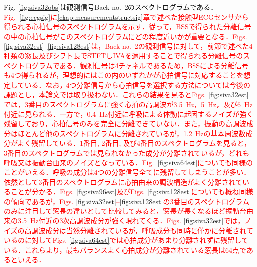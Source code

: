 Fig. \ref{fig:siva32obs}は観測信号Back no.~2のスペクトログラムである．\textcolor{red}{Fig.~\ref{fig:ecgsig}に\ref{chap:measurementstructsig}章で述べた接触型ECGセンサから得られる心拍信号のスペクトログラムを示す．従って，BSSで得られた分離信号の中の心拍信号がこのスペクトログラムにどの程度近いかが重要となる．Figs. \ref{fig:siva32est}--\ref{fig:siva128est}は，Back no.~2の観測信号に対して，前節で述べた4種類の窓長及びシフト長でSTFTしIVAを適用することで得られる分離信号のスペクトログラムである．観測信号は4チャネルであるため，BSSによる分離信号も4つ得られるが，理想的にはこの内のいずれかが心拍信号に対応することを想定している．なお，4つ分離信号から心拍信号を選択する方法については今後の課題とし，本論文では取り扱わない．これらの結果を見るとFigs. \ref{fig:siva32est}では，3番目のスペクトログラムに強く心拍の高調波が3.5~Hz，5~Hz，及び6~Hz付近に見られる．一方で，0.4~Hz付近に呼吸による体動に起因するノイズが強く残留しており，心拍信号のみを完全に分離できていない．また，振動の高調波成分はほとんど他のスペクトログラムに分離されているが，1.2~Hzの基本周波数成分がよく残留している．1番目, 2番目, 及び4番目のスペクトログラムを見ると，3番目のスペクトログラムでは見られなかった成分が分離されているが，どれも呼吸又は振動台由来のノイズとなっている．Fig.~\ref{fig:siva64est}についても同様のことがいえる．呼吸の成分は4つの分離信号全てに残留してしまうことが多い．依然として3番目のスペクトログラムに心拍由来の調波構造がよく分離されていることが分かる．Figs. \ref{fig:siva96est}及びFigs. \ref{fig:siva128est}についても概ね同様の傾向であるが，Figs. \ref{fig:siva32est}--\ref{fig:siva128est}の3番目のスペクトログラムのみに注目して窓長の違いとして比較してみると，窓長が長くなるほど振動台由来の3.5~Hz付近の3次高調波成分が強く現れてくる．Figs. \ref{fig:siva32est}では，ノイズの高調波成分は当然分離されているが，呼吸成分も同時に僅かに分離されているのに対してFigs. \ref{fig:siva64est}では心拍成分があまり分離されずに残留している．これらより，最もバランスよく心拍成分が分離されている窓長は64点であるといえる．}

